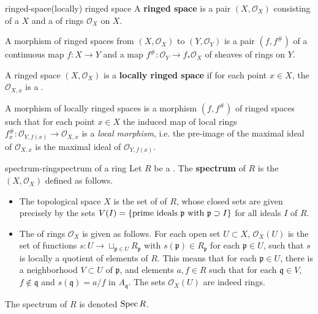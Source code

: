 \begin{topic}{ringed-space}{(locally) ringed space}
    A \textbf{ringed space} is a pair $(X, \mathcal{O}_X)$ consisting of a  $X$ and a  of rings $\mathcal{O}_X$ on $X$.
    
    A morphism of ringed spaces from $(X, \mathcal{O}_X)$ to $(Y, \mathcal{O}_Y)$ is a pair $(f, f^\#)$ of a continuous map $f : X \to Y$ and a map $f^\# : \mathcal{O}_Y \to f_* \mathcal{O}_X$ of sheaves of rings on $Y$.
    
    A ringed space $(X, \mathcal{O}_X)$ is a \textbf{locally ringed space} if for each point $x \in X$, the  $\mathcal{O}_{X,x}$ is a .
    
    A morphism of locally ringed spaces is a morphism $(f, f^\#)$ of ringed spaces such that for each point $x \in X$ the induced map of local rings $f^\#_x : \mathcal{O}_{Y, f(x)} \to \mathcal{O}_{X, x}$ is a \textit{local morphism}, i.e. the pre-image of the maximal ideal of $\mathcal{O}_{X, x}$ is the maximal ideal of $\mathcal{O}_{Y, f(x)}$.
\end{topic}

\begin{topic}{spectrum-ring}{spectrum of a ring}
    Let $R$ be a . The \textbf{spectrum} of $R$ is the  $(X, \mathcal{O}_X)$ defined as follows.
    \begin{itemize}
        \item The topological space $X$ is the set of  of $R$, whose closed sets are given precisely by the sets $V(I) = \{ \textup{prime ideals } \mathfrak{p} \textup{ with } \mathfrak{p} \supset I \}$ for all ideals $I$ of $R$.
        \item The  of rings $\mathcal{O}_X$ is given as follows. For each open set $U \subset X$, $\mathcal{O}_X(U)$ is the set of functions $s : U \to \sqcup_{\mathfrak{p} \in U} R_\mathfrak{p}$ with $s(\mathfrak{p}) \in R_\mathfrak{p}$ for each $\mathfrak{p} \in U$, such that $s$ is locally a quotient of elements of $R$. This means that for each $\mathfrak{p} \in U$, there is a neighborhood $V \subset U$ of $\mathfrak{p}$, and elements $a, f \in R$ such that for each $\mathfrak{q} \in V$, $f \not\in \mathfrak{q}$ and $s(\mathfrak{q}) = a/f$ in $A_\mathfrak{q}$. The sets $\mathcal{O}_X(U)$ are indeed rings.
    \end{itemize}
    The spectrum of $R$ is denoted $\operatorname{Spec} R$.
\end{topic}


